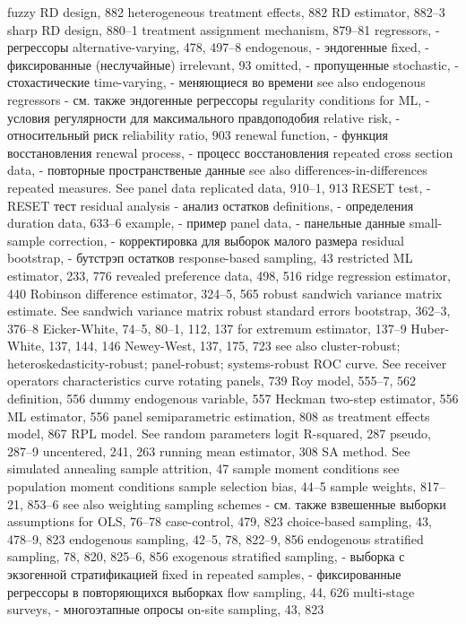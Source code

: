 fuzzy RD design, 882
heterogeneous treatment effects, 882
RD estimator, 882–3
sharp RD design, 880–1
treatment assignment mechanism, 879–81
regressors, - регрессоры
alternative-varying, 478, 497–8 
endogenous, - эндогенные
fixed, - фиксированные (неслучайные)
irrelevant, 93
omitted, - пропущенные
stochastic, - стохастические
time-varying, - меняющиеся во времени
see also endogenous regressors - см. также эндогенные регрессоры
regularity conditions for ML, - условия регулярности для максимального правдоподобия
relative risk, - относительный риск
reliability ratio, 903
renewal function, - функция восстановления
renewal process, - процесс восстановления
repeated cross section data, - повторные пространственые данные
see also differences-in-differences repeated measures. See panel data replicated data, 910–1, 913
RESET test, - RESET тест
residual analysis - анализ остатков
definitions, - определения
duration data, 633–6 
example, - пример
panel data, - панельные данные
small-sample correction, - корректировка для выборок малого размера
residual bootstrap, - бутстрэп остатков
response-based sampling, 43
restricted ML estimator, 233, 776
revealed preference data, 498, 516
ridge regression estimator, 440
Robinson difference estimator, 324–5, 565 robust sandwich variance matrix estimate. See
sandwich variance matrix robust standard errors
bootstrap, 362–3, 376–8
Eicker-White, 74–5, 80–1, 112, 137
for extremum estimator, 137–9
Huber-White, 137, 144, 146
Newey-West, 137, 175, 723
see also cluster-robust; heteroskedasticity-robust;
panel-robust; systems-robust
ROC curve. See receiver operators characteristics
curve
rotating panels, 739
Roy model, 555–7, 562
definition, 556
dummy endogenous variable, 557 Heckman two-step estimator, 556 ML estimator, 556
panel semiparametric estimation, 808 as treatment effects model, 867
RPL model. See random parameters logit R-squared, 287
pseudo, 287–9
uncentered, 241, 263 running mean estimator, 308
SA method. See simulated annealing sample attrition, 47
sample moment conditions
see population moment conditions sample selection bias, 44–5
sample weights, 817–21, 853–6
see also weighting sampling schemes - см. также взвешенные выборки
assumptions for OLS, 76–78
case-control, 479, 823
choice-based sampling, 43, 478–9, 823 endogenous sampling, 42–5, 78, 822–9, 856 endogenous stratified sampling, 78, 820, 825–6,
856
exogenous stratified sampling, - выборка с экзогенной стратификацией
fixed in repeated samples,  - фиксированные регрессоры в повторяющихся выборках
flow sampling, 44, 626
multi-stage surveys, - многоэтапные опросы
on-site sampling, 43, 823
